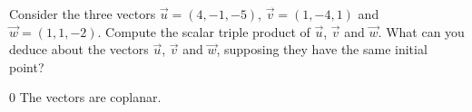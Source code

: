 
\begin{Exercise}[
name={},
title={}, 
difficulty=0,
origin={\cite{MH}}]
Consider the three vectors $\vec{u}=(4,-1,-5)$, $\vec{v}=(1,-4,1)$ and $\vec{w}=(1,1,-2)$.
\Question Compute the scalar triple product of $\vec{u}$, $\vec{v}$ and $\vec{w}$.
\Question What can you deduce about the vectors $\vec{u}$, $\vec{v}$ and $\vec{w}$, supposing they have the same initial point?
\end{Exercise}

\begin{Answer}
\Question $0$
\Question The vectors are coplanar.
\end{Answer}
